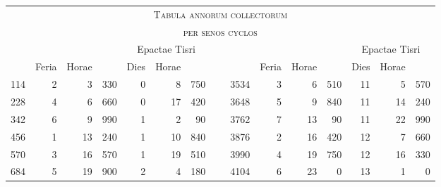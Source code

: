 %
\begin{tabnums} %
\footnotesize
\small
\centering
\setlength{\tabcolsep}{0.9ex}
%
\newcommand{\da}{{\scriptsize †}}
\newcommand{\db}{{\scriptsize ‡}}
\newcommand{\ang}{90}
\newcommand{\hsa}[1]{\footnotesize{#1}}
\newcommand{\hsb}[1]{\scriptsize{#1}}
\newcommand{\hdrA}{%
  &
  \multicolumn{3}{c}{\hsa{\ch{Character ann}{Character annorum collectorum}}} &
  \multicolumn{3}{c}{\hsa{Epactae Tisri}}
}
%
\newcommand{\hdrB}{%
  \ch{8888}{\hsb{Anni collecti}}&
  \hsb{Feria} &
  \hsb{Horae} &
  \hsb{\ch{mmm}{Scru\-pu\-la 1080}} &
  \hsb{Dies} &
  \hsb{Horae} &
  \hsb{\ch{mmm}{Scru\-pu\-la 1080}} 
}
%
\newcommand{\hdrs}{%
 \hdrA & \hspace{1em} & \hdrA \\
 \cmidrule(lr){2-4} \cmidrule(lr){5-7} \cmidrule(lr){10-12} \cmidrule(lr){13-15}
 \hdrB & & \hdrB \\
 \cmidrule(r){1-7} \cmidrule(l){9-15}
}
%
\begin{tabular}[c]{@{} r rrr rrr c r rrr rrr@{}}
\toprule
\multicolumn{15}{c}{\Large\textsc{Tabula annorum collectorum}} \\
\multicolumn{15}{c}{\large\textsc{per senos cyclos}} \\
\toprule
\hdrs %
 114& 2& ~3&  330&  0& ~8&  750 &~& 3534& 3& ~6&  510& 11& ~5&  570\\
 228& 4& ~6&  660&  0& 17&  420 &~& 3648& 5& ~9&  840& 11& 14&  240\\
 342& 6& ~9&  990&  1& ~2&   90 &~& 3762& 7& 13&   90& 11& 22&  990\\
 456& 1& 13&  240&  1& 10&  840 &~& 3876& 2& 16&  420& 12& ~7&  660\\
 570& 3& 16&  570&  1& 19&  510 &~& 3990& 4& 19&  750& 12& 16&  330\\
 684& 5& 19&  900&  2& ~4&  180 &~& 4104& 6& 23&    0& 13& ~1&    0\\

\end{tabular}
\end{tabnums}
